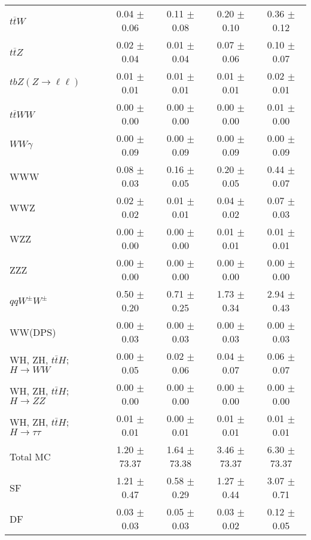 \begin{tabular}{l|cccc}
                   $t\overline{t}W$ &  0.04 $\pm$  0.06 &  0.11 $\pm$  0.08 &  0.20 $\pm$  0.10 &  0.36 $\pm$  0.12 \\
                   $t\overline{t}Z$ &  0.02 $\pm$  0.04 &  0.01 $\pm$  0.04 &  0.07 $\pm$  0.06 &  0.10 $\pm$  0.07 \\
    $tbZ (Z \rightarrow \ell \ell)$ &  0.01 $\pm$  0.01 &  0.01 $\pm$  0.01 &  0.01 $\pm$  0.01 &  0.02 $\pm$  0.01 \\
                  $t\overline{t}WW$ &  0.00 $\pm$  0.00 &  0.00 $\pm$  0.00 &  0.00 $\pm$  0.00 &  0.01 $\pm$  0.00 \\
                         $WW\gamma$ &  0.00 $\pm$  0.09 &  0.00 $\pm$  0.09 &  0.00 $\pm$  0.09 &  0.00 $\pm$  0.09 \\
                                WWW &  0.08 $\pm$  0.03 &  0.16 $\pm$  0.05 &  0.20 $\pm$  0.05 &  0.44 $\pm$  0.07 \\
                                WWZ &  0.02 $\pm$  0.02 &  0.01 $\pm$  0.01 &  0.04 $\pm$  0.02 &  0.07 $\pm$  0.03 \\
                                WZZ &  0.00 $\pm$  0.00 &  0.00 $\pm$  0.00 &  0.01 $\pm$  0.01 &  0.01 $\pm$  0.01 \\
                                ZZZ &  0.00 $\pm$  0.00 &  0.00 $\pm$  0.00 &  0.00 $\pm$  0.00 &  0.00 $\pm$  0.00 \\
                 $qqW^{\pm}W^{\pm}$ &  0.50 $\pm$  0.20 &  0.71 $\pm$  0.25 &  1.73 $\pm$  0.34 &  2.94 $\pm$  0.43 \\
                            WW(DPS) &  0.00 $\pm$  0.03 &  0.00 $\pm$  0.03 &  0.00 $\pm$  0.03 &  0.00 $\pm$  0.03 \\
WH, ZH, $t\bar{t}H$; $H \rightarrow WW$ &  0.00 $\pm$  0.05 &  0.02 $\pm$  0.06 &  0.04 $\pm$  0.07 &  0.06 $\pm$  0.07 \\
WH, ZH, $t\bar{t}H$; $H \rightarrow ZZ$ &  0.00 $\pm$  0.00 &  0.00 $\pm$  0.00 &  0.00 $\pm$  0.00 &  0.00 $\pm$  0.00 \\
WH, ZH, $t\bar{t}H$; $H \rightarrow \tau\tau$ &  0.01 $\pm$  0.01 &  0.00 $\pm$  0.01 &  0.01 $\pm$  0.01 &  0.01 $\pm$  0.01 \\
\hline\hline
                           Total MC &  1.20 $\pm$ 73.37 &  1.64 $\pm$ 73.38 &  3.46 $\pm$ 73.37 &  6.30 $\pm$ 73.37 \\
\hline
                                 SF &  1.21 $\pm$  0.47 &  0.58 $\pm$  0.29 &  1.27 $\pm$  0.44 &  3.07 $\pm$  0.71 \\
                                 DF &  0.03 $\pm$  0.03 &  0.05 $\pm$  0.03 &  0.03 $\pm$  0.02 &  0.12 $\pm$  0.05 \\

\end{tabular}
